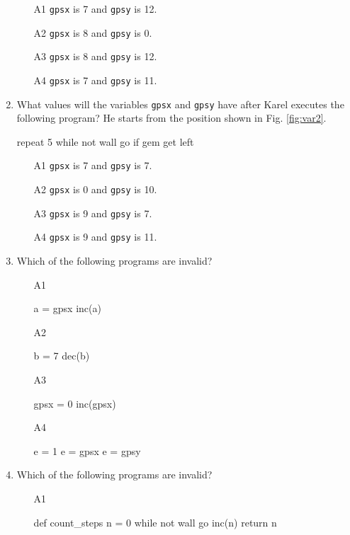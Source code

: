 \begin{enumerate}
\begin{enumerate}
\item[A1] {\tt gpsx} is 7 and {\tt gpsy} is 12.
\item[A2] {\tt gpsx} is 8 and {\tt gpsy} is 0.
\item[A3] {\tt gpsx} is 8 and {\tt gpsy} is 12.
\item[A4] {\tt gpsx} is 7 and {\tt gpsy} is 11.
\end{enumerate}
\item What values will the variables {\tt gpsx} and {\tt gpsy} have after
Karel executes the following program? He starts from the position shown 
in Fig. \ref{fig:var2}.
\begin{bluecode}
repeat 5
    while not wall
        go
        if gem
            get
    left
\end{bluecode}
\begin{enumerate}
\item[A1] {\tt gpsx} is 7 and {\tt gpsy} is 7.
\item[A2] {\tt gpsx} is 0 and {\tt gpsy} is 10.
\item[A3] {\tt gpsx} is 9 and {\tt gpsy} is 7.
\item[A4] {\tt gpsx} is 9 and {\tt gpsy} is 11.
\end{enumerate}
\item Which of the following programs are invalid?
\begin{enumerate}
\item[A1] 
\begin{bluecode}
a = gpsx
inc(a)
\end{bluecode}
\item[A2] 
\begin{bluecode}
b = 7
dec(b)
\end{bluecode}
\item[A3] 
\begin{bluecode}
gpsx = 0
inc(gpsx)
\end{bluecode}
\item[A4] 
\begin{bluecode}
e = 1
e = gpsx
e = gpsy
\end{bluecode}
\end{enumerate}
\item Which of the following programs are invalid?
\begin{enumerate}
\item[A1] 
\begin{bluecode}
def count_steps
    n = 0
    while not wall
        go
        inc(n)
    return n

\end{bluecode}
\end{enumerate}
\end{enumerate}
